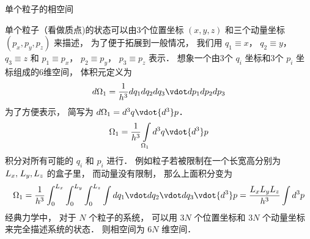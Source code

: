 
单个粒子的相空间

单个粒子（看做质点)的状态可以由3个位置坐标 $\left( {x,y,z} \right)$ 和三个动量坐标 $\left( {{p_x},{p_y},{p_z}} \right)$ 来描述， 为了便于拓展到一般情况， 我们用 ${q_1} \equiv x$，   ${q_2} \equiv y$， ${q_3} \equiv z$   和 ${p_1} \equiv {p_x}$，   ${p_2} \equiv {p_y}$， ${p_3} \equiv {p_z}$   表示． 想象一个由3个 ${q_i}$  坐标和3个 ${p_i}$  坐标组成的6维空间， 体积元定义为
 \begin{equation}
d{\Omega_1} = \frac{1}{h^3}d{q_1}d{q_2}d{q_3} \vdot d{p_1}d{p_2}d{p_3}
\end{equation} 
为了方便表示， 简写为  $d{\Omega_1} = {d^3}q \vdot {d^3}p$． 
  \begin{equation}
{\Omega_1} = \frac{1}{h^3}\int\limits_{\Omega_1} {{d^3}q \vdot {d^3}p} 
\end{equation} 
积分对所有可能的 ${q_i}$ 和 ${p_i}$ 进行． 例如粒子若被限制在一个长宽高分别为 ${L_x},{\kern 1pt} {L_y},{L_z}$ 的盒子里， 而动量没有限制， 那么上面积分变为
  \begin{equation}
{\Omega_1} = \frac{1}{h^3}\int_0^{L_x} {\int_0^{L_y} {\int_0^{L_z} {\int {d{q_1} \vdot d{q_2} \vdot d{q_3}} } }  \vdot {d^3}p}  = \frac{{L_x}{L_y}{L_z}}{h^3}\int {{d^3}p} 
\end{equation} 
经典力学中， 对于 $N$ 个粒子的系统， 可以用 $3N$ 个位置坐标和 $3N$ 个动量坐标来完全描述系统的状态． 则相空间为 $6N$ 维空间．

